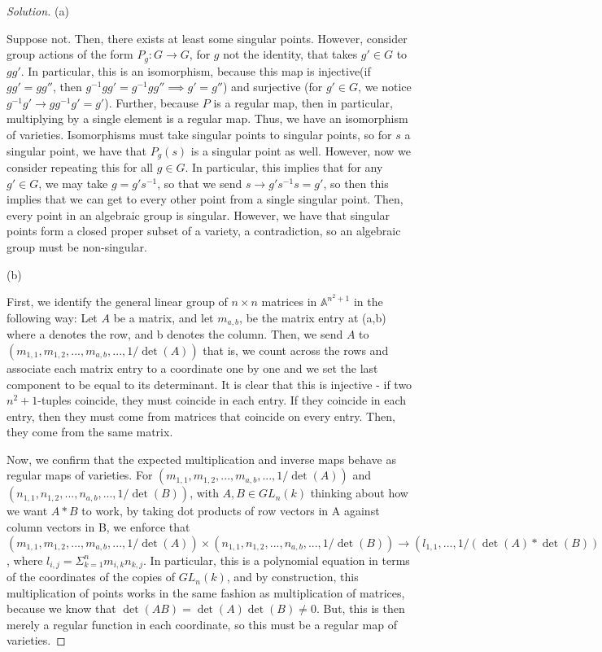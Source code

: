 \documentclass[10pt]{article}
\begin{document}
\begin{proof}[Solution]

(a)

Suppose not. Then, there exists at least some singular points. However, consider group actions of the form $P_g: G \to G$, for $g$ not the identity, that takes $g' \in G$ to $g g'$. In particular, this is an isomorphism, because this map is injective(if $gg' = gg''$, then $g^{-1}gg' = g^{-1}gg'' \implies g' = g''$) and surjective (for $g' \in G$, we notice $g^{-1}g' \to gg^{-1}g' = g'$). Further, because $P$ is a regular map, then in particular, multiplying by a single element is a regular map. Thus, we have an isomorphism of varieties. Isomorphisms must take singular points to singular points, so for $s$ a singular point, we have that $P_g(s)$ is a singular point as well. However, now we consider repeating this for all $g \in G$. In particular, this implies that for any $g' \in G$, we may take $g = g's^{-1}$, so that we send $s \to g's^{-1}s = g'$, so then this implies that we can get to every other point from a single singular point. Then, every point in an algebraic group is singular. However, we have that singular points form a closed proper subset of a variety, a contradiction, so an algebraic group must be non-singular.

(b)

First, we identify the general linear group of $n\times n$ matrices in $\mathbb{A}^{n^2+1}$ in the following way: Let $A$ be a matrix, and let $m_{a,b}$, be the matrix entry at (a,b) where a denotes the row, and b denotes the column. Then, we send $A$ to $(m_{1,1}, m_{1,2},...,m_{a,b},...,1/\det(A))$ that is, we count across the rows and associate each matrix entry to a coordinate one by one and we set the last component to be equal to its determinant. It is clear that this is injective - if two $n^2+1$-tuples coincide, they must coincide in each entry. If they coincide in each entry, then they must come from matrices that coincide on every entry. Then, they come from the same matrix.

Now, we confirm that the expected multiplication and inverse maps behave as regular maps of varieties. For $(m_{1,1}, m_{1,2},...,m_{a,b},...,1/\det(A))$ and $(n_{1,1}, n_{1,2},...,n_{a,b},...,1/\det(B))$, with $A,B \in GL_n(k)$ thinking about how we want $A*B$ to work, by taking dot products of row vectors in A against column vectors in B, we enforce that $(m_{1,1}, m_{1,2},...,m_{a,b},...,1/\det(A)) \times (n_{1,1}, n_{1,2},...,n_{a,b},...,1/\det(B)) \to (l_{1,1},...,1/(\det(A)*\det(B)))$, where $l_{i,j} = \Sigma_{k=1}^n m_{i,k}n_{k,j}$. In particular, this is a polynomial equation in terms of the coordinates of the copies of $GL_n(k)$, and by construction, this multiplication of points works in the same fashion as multiplication of matrices, because we know that $\det(AB) = \det(A) \det(B) \not = 0$. But, this is then merely a regular function in each coordinate, so this must be a regular map of varieties.


\end{proof}
\end{document}
